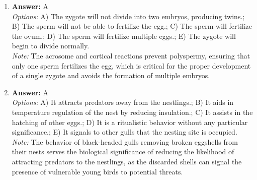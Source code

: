 \documentclass[12pt]{article}
\begin{document}
\begin{enumerate}[label=\arabic*.]
\item \textbf{Answer:} A
\\ \textit{Options:} A) The zygote will not divide into two embryos, producing twins.; B) The sperm will not be able to fertilize the egg.; C) The sperm will fertilize the ovum.; D) The sperm will fertilize multiple eggs.; E) The zygote will begin to divide normally.
\\ \textit{Note:} The acrosome and cortical reactions prevent polyspermy, ensuring that only one sperm fertilizes the egg, which is critical for the proper development of a single zygote and avoids the formation of multiple embryos.
\item \textbf{Answer:} A
\\ \textit{Options:} A) It attracts predators away from the nestlings.; B) It aids in temperature regulation of the nest by reducing insulation.; C) It assists in the hatching of other eggs.; D) It is a ritualistic behavior without any particular significance.; E) It signals to other gulls that the nesting site is occupied.
\\ \textit{Note:} The behavior of black-headed gulls removing broken eggshells from their nests serves the biological significance of reducing the likelihood of attracting predators to the nestlings, as the discarded shells can signal the presence of vulnerable young birds to potential threats.
\end{enumerate}
\end{document}
